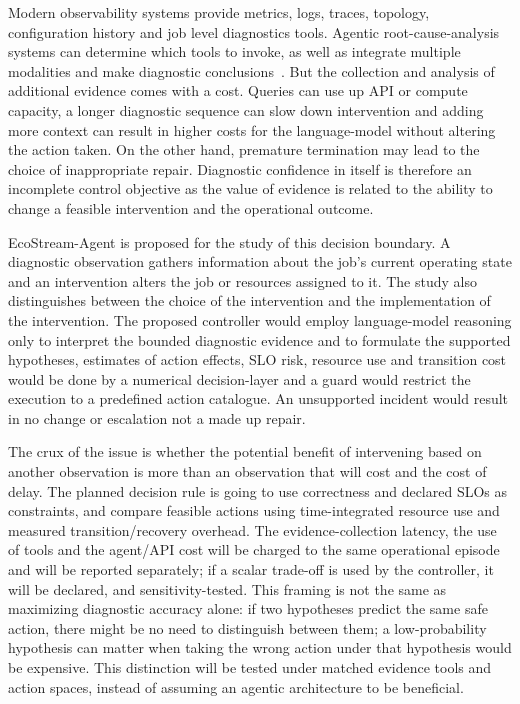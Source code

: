 \documentclass[journal]{IEEEtran}
\begin{document}
Modern observability systems provide metrics, logs, traces, topology, configuration history and job level diagnostics tools. Agentic root-cause-analysis systems can determine which tools to invoke, as well as integrate multiple modalities and make diagnostic conclusions~\cite{wang2024rcagent,zhang2023diagfusion,yu2023nezha,zhang2025tamo}. But the collection and analysis of additional evidence comes with a cost. Queries can use up API or compute capacity, a longer diagnostic sequence can slow down intervention and adding more context can result in higher costs for the language-model without altering the action taken. On the other hand, premature termination may lead to the choice of inappropriate repair. Diagnostic confidence in itself is therefore an incomplete control objective as the value of evidence is related to the ability to change a feasible intervention and the operational outcome.

EcoStream-Agent is proposed for the study of this decision boundary. A diagnostic observation gathers information about the job's current operating state and an intervention alters the job or resources assigned to it. The study also distinguishes between the choice of the intervention and the implementation of the intervention. The proposed controller would employ language-model reasoning only to interpret the bounded diagnostic evidence and to formulate the supported hypotheses, estimates of action effects, SLO risk, resource use and transition cost would be done by a numerical decision-layer and a guard would restrict the execution to a predefined action catalogue. An unsupported incident would result in no change or escalation not a made up repair.

The crux of the issue is whether the potential benefit of intervening based on another observation is more than an observation that will cost and the cost of delay. The planned decision rule is going to use correctness and declared SLOs as constraints, and compare feasible actions using time-integrated resource use and measured transition/recovery overhead. The evidence-collection latency, the use of tools and the agent/API cost will be charged to the same operational episode and will be reported separately; if a scalar trade-off is used by the controller, it will be declared, and sensitivity-tested. This framing is not the same as maximizing diagnostic accuracy alone: if two hypotheses predict the same safe action, there might be no need to distinguish between them; a low-probability hypothesis can matter when taking the wrong action under that hypothesis would be expensive. This distinction will be tested under matched evidence tools and action spaces, instead of assuming an agentic architecture to be beneficial.
\end{document}
